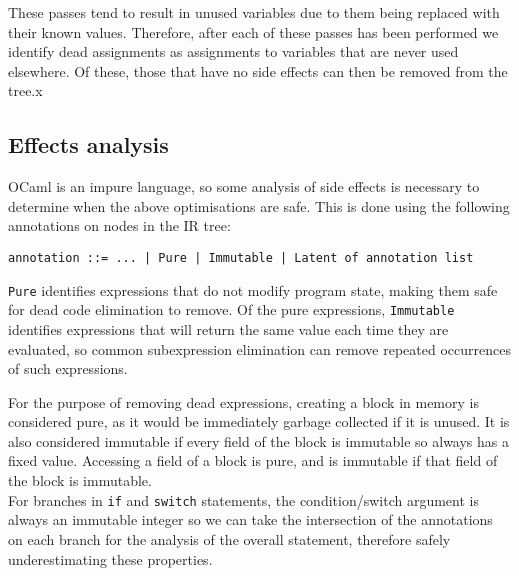 These passes tend to result in unused variables due to them being replaced with their known values. Therefore, after each of these passes has been performed we identify dead assignments as assignments to variables that are never used elsewhere. Of these, those that have no side effects can then be removed from the tree.x



\subsection{Effects analysis}
OCaml is an impure language, so some analysis of side effects is necessary to determine when the above optimisations are safe. This is done using the following annotations on nodes in the IR tree:

\verb"annotation ::= ... | Pure | Immutable | Latent of annotation list"

\verb|Pure| identifies expressions that do not modify program state, making them safe for dead code elimination to remove. Of the pure expressions, \verb|Immutable| identifies expressions that will return the same value each time they are evaluated, so common subexpression elimination can remove repeated occurrences of such expressions.

For the purpose of removing dead expressions, creating a block in memory is considered pure, as it would be immediately garbage collected if it is unused. It is also considered immutable if every field of the block is immutable so always has a fixed value. Accessing a field of a block is pure, and is immutable if that field of the block is immutable. \\
For branches in \verb|if| and \verb|switch| statements, the condition/switch argument is always an immutable integer so we can take the intersection of the annotations on each branch for the analysis of the overall statement, therefore safely underestimating these properties. 


